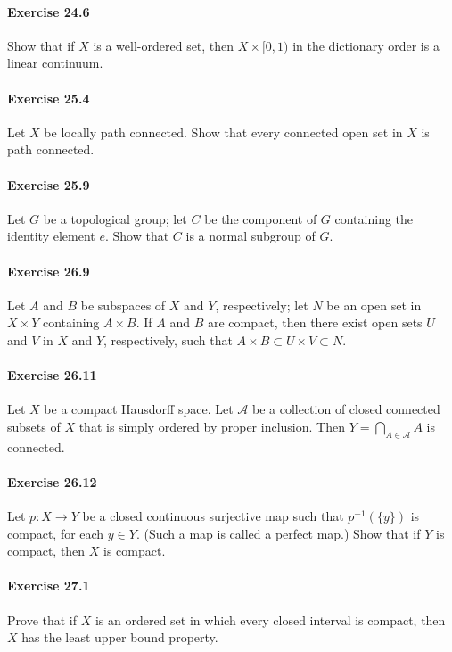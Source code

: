 \documentclass{article}
\begin{document}
\paragraph{Exercise 24.6} Show that if $X$ is a well-ordered set, then $X \times [0, 1)$ in the dictionary order is a linear continuum.

\paragraph{Exercise 25.4} Let $X$ be locally path connected. Show that every connected open set in $X$ is path connected.

\paragraph{Exercise 25.9} Let $G$ be a topological group; let $C$ be the component of $G$ containing the identity element $e$. Show that $C$ is a normal subgroup of $G$.

\paragraph{Exercise 26.9} Let $A$ and $B$ be subspaces of $X$ and $Y$, respectively; let $N$ be an open set in $X \times Y$ containing $A \times B$. If $A$ and $B$ are compact, then there exist open sets $U$ and $V$ in $X$ and $Y$, respectively, such that $A \times B \subset U \times V \subset N .$

\paragraph{Exercise 26.11} Let $X$ be a compact Hausdorff space. Let $\mathcal{A}$ be a collection of closed connected subsets of $X$ that is simply ordered by proper inclusion. Then $Y=\bigcap_{A \in \mathcal{A}} A$ is connected.

\paragraph{Exercise 26.12} Let $p: X \rightarrow Y$ be a closed continuous surjective map such that $p^{-1}(\{y\})$ is compact, for each $y \in Y$. (Such a map is called a perfect map.) Show that if $Y$ is compact, then $X$ is compact.

\paragraph{Exercise 27.1} Prove that if $X$ is an ordered set in which every closed interval is compact, then $X$ has the least upper bound property.
\end{document}
